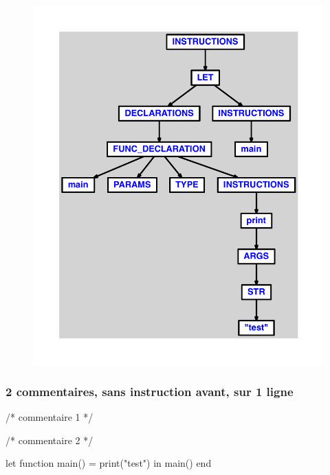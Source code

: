 \documentclass{article}
\begin{document}
\begin{figure}[H]\centering\includegraphics[max width=\textwidth]{ast/ast_153.pdf}\end{figure}\subsubsection{2 commentaires, sans instruction avant, sur 1 ligne}
\begin{verbatimtab}
/* commentaire 1 */

/* commentaire 2 */

let
	function main() = print("test")
in main() end
\end{verbatimtab}
\end{document}
